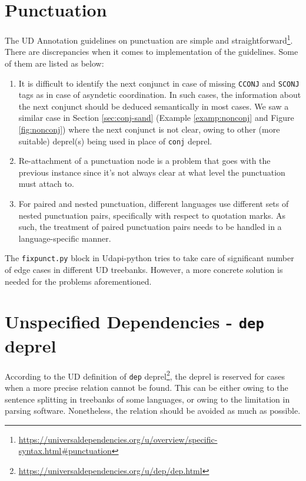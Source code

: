 \section{Punctuation}

The UD Annotation guidelines on punctuation are simple and straightforward\footnote{\url{https://universaldependencies.org/u/overview/specific-syntax.html\#punctuation}}. There are discrepancies when it comes to implementation of the guidelines. Some of them are listed as below:

\begin{enumerate}
    \item It is difficult to identify the next conjunct in case of missing \verb|CCONJ| and \verb|SCONJ| tags as in case of asyndetic coordination. In such cases, the information about the next conjunct should be deduced semantically in most cases. We saw a similar case in Section \ref{sec:conj-sand} (Example \ref{examp:nonconj} and Figure \ref{fig:nonconj}) where the next conjunct is not clear, owing to other (more suitable) deprel(s) being used in place of \verb|conj| deprel.
    \item Re-attachment of a punctuation node is a problem that goes with the previous instance since it's not always clear at what level the punctuation must attach to.
    \item For paired and nested punctuation, different languages use different sets of nested punctuation pairs, specifically with respect to quotation marks. As such, the treatment of paired punctuation pairs needs to be handled in a language-specific manner.
\end{enumerate}

The \verb|fixpunct.py| block in Udapi-python \citep{udapi} tries to take care of significant number of edge cases in different UD treebanks. However, a more concrete solution is needed for the problems aforementioned.

\section{Unspecified Dependencies - \texttt{dep} deprel}

According to the UD definition of \verb|dep| deprel\footnote{\url{https://universaldependencies.org/u/dep/dep.html}}, the deprel is reserved for cases when a more precise relation cannot be found. This can be either owing to the sentence splitting in treebanks of some languages, or owing to the limitation in parsing software. Nonetheless, the relation should be avoided as much as possible.

